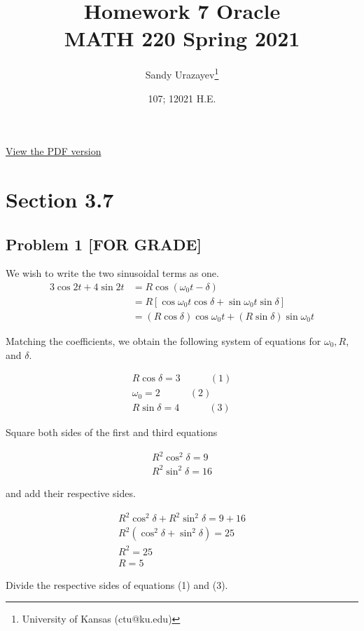 \documentclass[12pt]{article}
\author{Sandy Urazayev\thanks{University of Kansas (ctu@ku.edu)}}
\date{107; 12021 H.E.}
\title{Homework 7 Oracle\\\medskip
\large MATH 220 Spring 2021}
\begin{document}
\maketitle
\href{./index.pdf}{View the PDF version​}
\section*{Section 3.7}
\label{sec:orgd213da5}
\subsection*{Problem 1 [FOR GRADE]}
\label{sec:org7780792}
We wish to write the two sinusoidal terms as one.
\begin{align*}
	3 \cos 2 t+4 \sin 2 t & =R \cos \left(\omega_{0} t-\delta\right)                                   \\
	                      & =R\left[\cos \omega_{0} t \cos \delta+\sin \omega_{0} t \sin \delta\right] \\
	                      & =(R \cos \delta) \cos \omega_{0} t+(R \sin \delta) \sin \omega_{0} t
\end{align*}

Matching the coefficients, we obtain the following system of equations for
\(\omega_{0}, R\), and \(\delta\).

\begin{align*}
R \cos \delta=3 \quad \quad \quad (1)\\
\omega_{0}=2 \quad \quad \quad (2)\\
R \sin \delta=4 \quad \quad \quad (3)
\end{align*}

Square both sides of the first and third equations

\begin{align*}
R^{2} \cos ^{2} \delta=9 \\
R^{2} \sin ^{2} \delta=16
\end{align*}

and add their respective sides.

\begin{align*}
R^{2} \cos ^{2} \delta+R^{2} \sin ^{2} \delta=9+16 \\
R^{2}\left(\cos ^{2} \delta+\sin ^{2} \delta\right)=25 \\
R^{2}=25 \\
R=5
\end{align*}

Divide the respective sides of equations (1) and (3).
\end{document}
